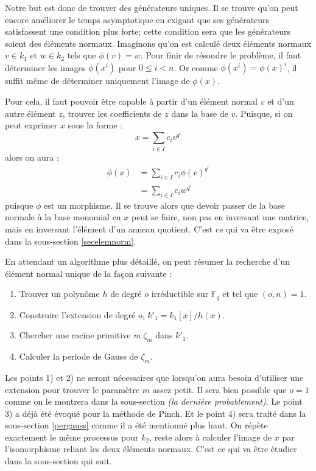 \documentclass[a4paper]{article} %
\numberwithin{section}{part}
\numberwithin{equation}{section}
\newcommand\nroot[1]{\textit{#1}\up{\textit{ième}}}
\newcommand\GF[1]{\mathbb{F}_{#1}}
\begin{document}
Notre but est donc de trouver des générateurs uniques. Il se trouve qu'on peut
encore améliorer le temps asymptotique en exigant que ses générateurs
satisfassent une condition plus forte; cette condition sera que les générateurs
soient des éléments normaux. Imaginons qu'on est calculé deux éléments normaux
$v\in k_1$ et $w\in k_2$ tels que $\phi(v) = w$. Pour finir de résoudre
le problème, il faut déterminer les images $\phi(x^i)$ pour $0\leq i < n$. Or
comme $\phi(x^i) = \phi(x)^i$, il suffit même de déterminer uniquement l'image
de $\phi(x)$.\par
Pour cela, il faut pouvoir être capable à partir d'un élément normal $v$ et d'un
autre élément $z$, trouver les coefficients de $z$ dans la base de $v$. Puisque,
si on peut exprimer $x$ sous la forme :
\[x = \sum_{i\in I}{c_iv^{q^i}}\]
alors on aura :
\begin{align*}
\phi(x) &= \sum_{i\in I}{c_i\phi(v)^{q^i}}\\
&= \sum_{i\in I}{c_iw^{q^i}}
\end{align*}
puisque $\phi$ est un morphisme. Il se trouve alors que devoir passer de la base
normale à la base monomial en $x$ peut se faire, non pas en inversant une
matrice, mais en inversant l'élément d'un anneau quotient. C'est ce qui va être
exposé dans la sous-section \ref{secelemnorm}.\par
En attendant un algorithme plus détaillé, on peut résumer la recherche d'un
élément normal unique de la façon suivante :
\vspace{0.3cm}
\begin{enumerate}[1)]
\item Trouver un polynôme $h$ de degré $o$ irréductible sur $\GF{q}$ et tel que 
$(o, n) = 1$.

\item Construire l'extension de degré $o$, $k'_1 = k_1[x]/h(x)$.

\item Chercher une racine primitive \nroot{m} $\zeta_m$ dans $k'_1$.

\item Calculer la periode de Gauss de $\zeta_m$.
\end{enumerate}
\vspace{0.3cm}
Les points 1) et 2) ne seront nécessaires que lorsqu'on aura besoin d'utiliser
une extension pour trouver le paramètre $m$ assez petit. Il sera bien possible
que $o = 1$ comme on le montrera dans la sous-section \textit{(la dernière
probablement)}. Le point 3) a déjà été évoqué pour la méthode de Pinch. Et le
point 4) sera traité dans la sous-section \ref{pergauss} comme il a été
mentionné plus haut. On répète exactement le même processus pour $k_2$, reste
alors à calculer l'image de $x$ par l'isomorphisme reliant les deux éléments
normaux. C'est ce qui va être étudier dans la sous-section qui suit.
\end{document}
